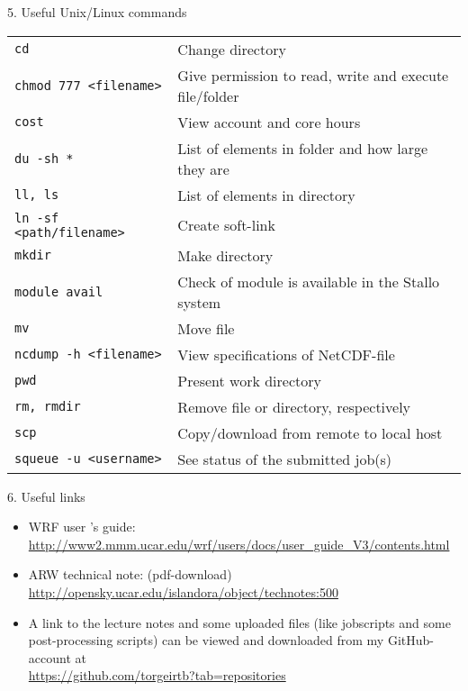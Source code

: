 \documentclass[xcolor=table]{beamer}
\begin{document}
\begin{frame}[fragile]{5. Useful Unix/Linux commands}
\begin{tabular}{p{4.5 cm} p{7	 cm}}
\texttt{cd}										 & Change directory \\
\texttt{chmod 777 <filename>} 	& Give permission to read, write and execute file/folder	\\
\texttt{cost} 				  					& View account and core hours 											  \\
\texttt{du -sh *} 								& List of elements in folder and how large they are \\
\texttt{ll, ls}										& List of elements in directory \\
\texttt{ln -sf <path/filename>}		& Create soft-link \\
\texttt{mkdir}									& Make directory	\\
\texttt{module avail}					  &  Check of module is available in the Stallo system 			\\	
\texttt{mv}										& Move file		\\
\texttt{ncdump -h <filename>}	& View specifications of NetCDF-file 	\\
\texttt{pwd}									& Present work directory \\
\texttt{rm, rmdir}							& Remove file or directory, respectively \\
\texttt{scp}									 & Copy/download from remote to local host \\
\texttt{squeue -u <username>}	& See status of the submitted job(s)
\end{tabular}
\end{frame}



\begin{frame}{6. Useful links}
\begin{itemize}
\item WRF user 's guide:\\
\url{http://www2.mmm.ucar.edu/wrf/users/docs/user_guide_V3/contents.html}\\
\item ARW technical note: (pdf-download)\\
\url{http://opensky.ucar.edu/islandora/object/technotes:500}
\item A link to the lecture notes and some uploaded files (like jobscripts and some post-processing scripts) can be viewed and downloaded from my GitHub-account at \\
\url{https://github.com/torgeirtb?tab=repositories}
\end{itemize}
\end{frame}
\end{document}
